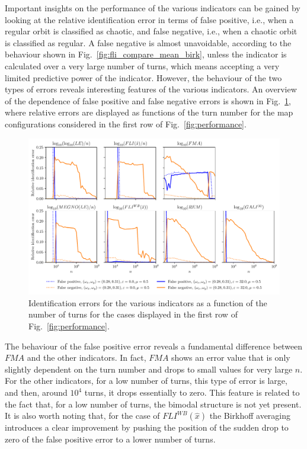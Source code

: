 Important insights on the performance of the various indicators can be gained by looking at the relative identification error in terms of false positive, i.e., when a regular orbit is classified as chaotic, and false negative, i.e., when a chaotic orbit is classified as regular. A false negative is almost unavoidable, according to the behaviour shown in Fig.~\ref{fig:fli_compare_mean_birk}, unless the indicator is calculated over a very large number of turns, which means accepting a very limited predictive power of the indicator. However, the behaviour of the two types of errors reveals interesting features of the various indicators. An overview of the dependence of false positive and false negative errors is shown in Fig.~\ref{fig:error_comparison}, where relative errors are displayed as functions of the turn number for the map configurations considered in the first row of Fig.~\ref{fig:performance}. 
%
\begin{figure}[htp]
    \centering
    \includegraphics[width=\textwidth]{6_dynamic_indicators/fig/corrected_figs/performance_specific_1_3.pdf}
    \caption{Identification errors for the various indicators as a function of the number of turns for the cases displayed in the first row of Fig.~\ref{fig:performance}.}
    \label{fig:error_comparison}
\end{figure}
%

The behaviour of the false positive error reveals a fundamental difference between $FMA$ and the other indicators. In fact, $FMA$ shows an error value that is only slightly dependent on the turn number and drops to small values for very large $n$. For the other indicators, for a low number of turns, this type of error is large, and then, around $10^4$ turns, it drops essentially to zero. This feature is related to the fact that, for a low number of turns, the bimodal structure is not yet present. It is also worth noting that, for the case of $FLI^{WB}(\hat{{x}})$ the Birkhoff averaging introduces a clear improvement by pushing the position of the sudden drop to zero of the false positive error to a lower number of turns.

